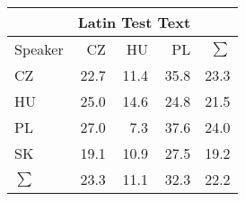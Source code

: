 \begin{tabular}{l|rrr|r}
\hline
 & \multicolumn{3}{c}{Latin Test Text} & \\
\hline
 Speaker   &   CZ &   HU &   PL &   $\sum$ \\
\hline
 CZ        & 22.7 & 11.4 & 35.8 &     23.3 \\
 HU        & 25.0 & 14.6 & 24.8 &     21.5 \\
 PL        & 27.0 &  7.3 & 37.6 &     24.0 \\
 SK        & 19.1 & 10.9 & 27.5 &     19.2 \\
\hline
 $\sum$   & 23.3 & 11.1 & 32.3 &     22.2 \\
\hline
\end{tabular}